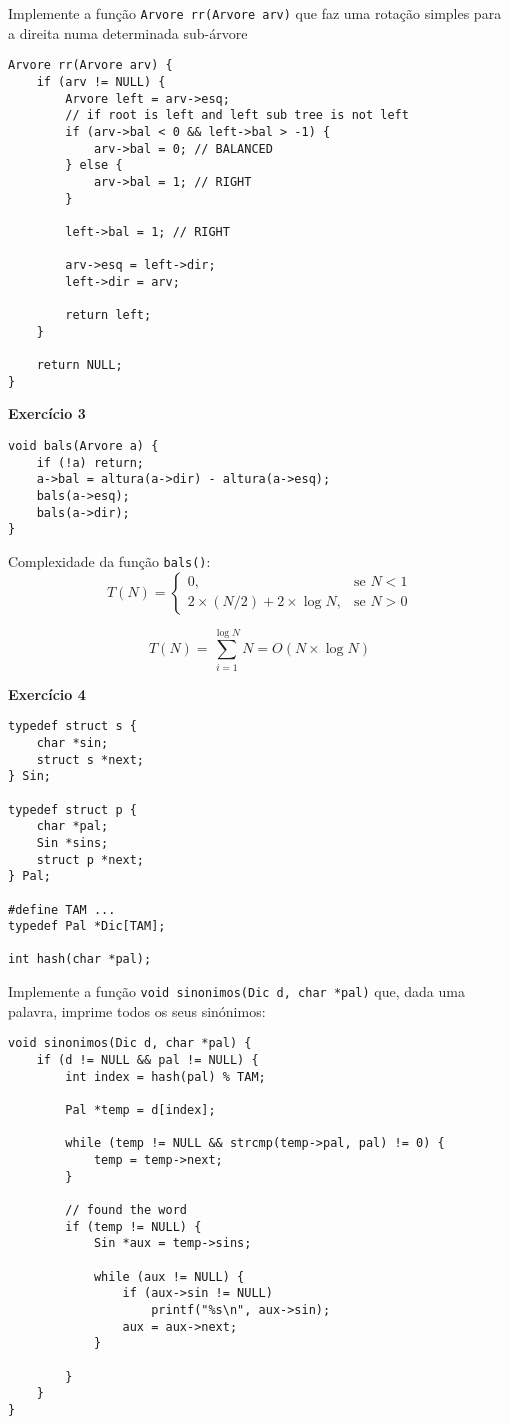 \documentclass{article}
\begin{document}
Implemente a função \texttt{Arvore rr(Arvore arv)} que faz uma rotação simples para a direita numa determinada sub-árvore
\begin{lstlisting}[style=mystyle]
Arvore rr(Arvore arv) {
    if (arv != NULL) {
        Arvore left = arv->esq;
        // if root is left and left sub tree is not left
        if (arv->bal < 0 && left->bal > -1) {
            arv->bal = 0; // BALANCED
        } else {
            arv->bal = 1; // RIGHT
        }

        left->bal = 1; // RIGHT

        arv->esq = left->dir;
        left->dir = arv;

        return left;
    }

    return NULL;
}
\end{lstlisting}

\vspace{0.7cm}
\textbf{Exercício 3}
\begin{lstlisting}[style=mystyle]
void bals(Arvore a) {
    if (!a) return;
    a->bal = altura(a->dir) - altura(a->esq);
    bals(a->esq);
    bals(a->dir);
}
\end{lstlisting}
Complexidade da função \texttt{bals()}:
\[
T(N)=
\begin{cases}
    0, & \text{se } N < 1 \\
    2 \times (N/2) + 2 \times \log N, & \text{se } N > 0 
\end{cases}
\]

\[
T(N)=\sum_{i=1}^{\log N} N = O(N \times \log N)
\]

\vspace{0.7cm}
\textbf{Exercício 4}
\begin{lstlisting}[style=mystyle]
typedef struct s {
    char *sin;
    struct s *next;
} Sin;

typedef struct p {
    char *pal;
    Sin *sins;
    struct p *next;
} Pal;

#define TAM ...
typedef Pal *Dic[TAM];

int hash(char *pal);
\end{lstlisting}

Implemente a função \texttt{void sinonimos(Dic d, char *pal)} que, dada uma palavra, imprime todos os seus sinónimos:
\begin{lstlisting}[style=mystyle]
void sinonimos(Dic d, char *pal) {
    if (d != NULL && pal != NULL) {
        int index = hash(pal) % TAM;

        Pal *temp = d[index];

        while (temp != NULL && strcmp(temp->pal, pal) != 0) {
            temp = temp->next;
        }

        // found the word
        if (temp != NULL) {
            Sin *aux = temp->sins;

            while (aux != NULL) {
                if (aux->sin != NULL)
                    printf("%s\n", aux->sin);
                aux = aux->next;
            }

        }
    }
}
\end{lstlisting}
\end{document}
